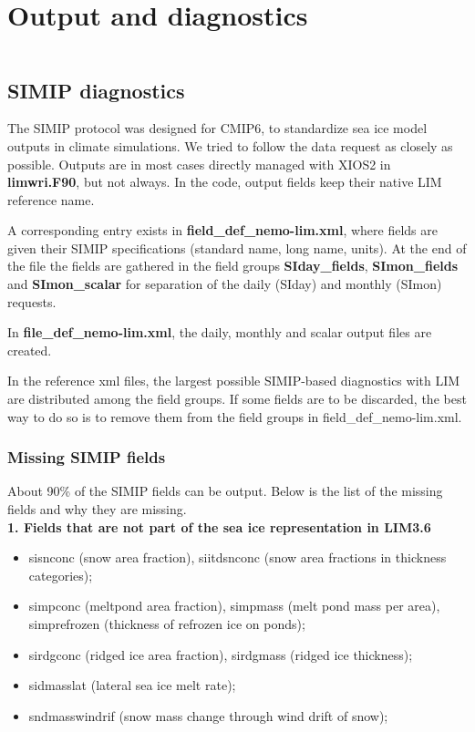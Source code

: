 \documentclass[../main/SI3_manual]{subfiles}
\begin{document}

\chapter{Output and diagnostics}
\label{chap:DIA}
\chaptertoc

\newpage
$\ $\newline    %

\section{SIMIP diagnostics}

The SIMIP protocol \citep{notz_2016} was designed for CMIP6, to standardize sea ice model outputs in climate simulations. We tried to follow the data request as closely as possible. Outputs are in most cases directly managed with XIOS2 in \textbf{limwri.F90}, but not always. In the code, output fields keep their native LIM reference name. 

A corresponding entry exists in \textbf{field\_def\_nemo-lim.xml}, where fields are given their SIMIP specifications (standard name, long name, units). At the end of the file the fields are gathered in the field groups \textbf{SIday\_fields}, \textbf{SImon\_fields} and \textbf{SImon\_scalar} for separation of the daily (SIday) and monthly (SImon) requests. 

In \textbf{file\_def\_nemo-lim.xml}, the daily, monthly and scalar output files are created.

In the reference xml files, the largest possible SIMIP-based diagnostics with LIM are distributed among the field groups. If some fields are to be discarded, the best way to do so is to remove them from the field groups in  field\_def\_nemo-lim.xml.

\subsection{Missing SIMIP fields}

About 90\% of the SIMIP fields can be output. Below is the list of the missing fields and why they are missing. \\

\textbf{1. Fields that are not part of the sea ice representation in LIM3.6}
\begin{itemize}
\item sisnconc (snow area fraction), siitdsnconc (snow area fractions in thickness categories);
\item simpconc (meltpond area fraction), simpmass (melt pond mass per area), simprefrozen (thickness of refrozen ice on ponds);
\item sirdgconc (ridged ice area fraction), sirdgmass (ridged ice thickness);
\item sidmasslat (lateral sea ice melt rate);
\item sndmasswindrif (snow mass change through wind drift of snow);
\end{itemize}
\end{document}
